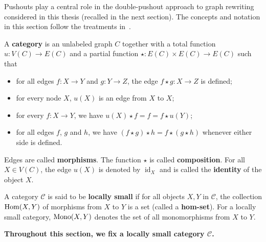 Pushouts play a central role in the double-pushout approach to graph rewriting considered in this thesis (recalled in the next section). The concepts and notation in this section follow the treatments in~\cite{pierce1991basic,barr1990category}.
\begin{definition}
    \label{def:cat}
    A \textbf{category} is an unlabeled graph \( C \) together with a total function \( u : V(C) \to E(C) \) and a partial function \( \star: E(C) \times E(C) \to E(C) \) such that 
        \begin{itemize}
            \item for all edges \( f:X \to Y \) and \( g:Y \to Z \), the edge \( f \star g :X \to Z \) is defined; 
            \item  for every node \( X \), \( u(X) \) is an edge from \( X \) to \( X \);
            \item for every \( f:X \to Y \), we have \(u(X) \star f = f = f \star u(Y)\);
            \item for all edges \( f \), \( g \) and \(h\), we have \( (f \star g) \star h = f \star (g \star h) \) whenever either side is defined.
        \end{itemize}
    Edges are called \textbf{morphisms}. The function $\star$ is called \textbf{composition}. For all \( X \in V(C) \), the edge \( u(X) \) is denoted by \( \operatorname{id}_X \) and is called the \textbf{identity} of the object \( X \).
\end{definition} 
\begin{definition}
    A category \(\mathcal{C}\) is said to be \textbf{locally small} if for all objects \(X,Y\) in \(\mathcal{C}\), the collection $\operatorname{Hom}(X,Y)$ of morphisms from \(X\) to \(Y\) is a set (called a \textbf{hom-set}). For a locally small category, $\operatorname{Mono}(X,Y)$ denotes the set of all monomorphisms from $X$ to $Y$.
\end{definition}
\textbf{Throughout this section, we fix a locally small category \( \mathcal{C} \).}
